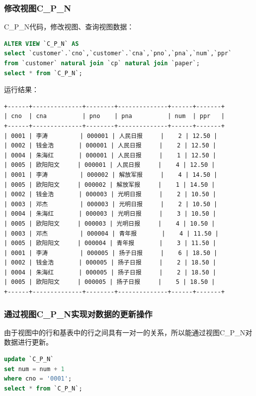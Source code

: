 \documentclass[hyperref,UTF8,c5size]{ctexart}
\begin{document}
        \subsubsection{修改视图C\_P\_N}
            C\_P\_N代码，修改视图、查询视图数据：
		    \begin{lstlisting}[language=SQL]
ALTER VIEW `C_P_N` AS 
select `customer`.`cno`,`customer`.`cna`,`pno`,`pna`,`num`,`ppr`
from `customer` natural join `cp` natural join `paper`;
select * from `C_P_N`;
		    \end{lstlisting}

            运行结果：
            \begin{lstlisting}
+------+--------------+--------+--------------+------+-------+
| cno  | cna          | pno    | pna          | num  | ppr   |
+------+--------------+--------+--------------+------+-------+
| 0001 | 李涛         | 000001 | 人民日报     |    2 | 12.50 |
| 0002 | 钱金浩       | 000001 | 人民日报     |    2 | 12.50 |
| 0004 | 朱海红       | 000001 | 人民日报     |    1 | 12.50 |
| 0005 | 欧阳阳文     | 000001 | 人民日报     |    4 | 12.50 |
| 0001 | 李涛         | 000002 | 解放军报     |    4 | 14.50 |
| 0005 | 欧阳阳文     | 000002 | 解放军报     |    1 | 14.50 |
| 0002 | 钱金浩       | 000003 | 光明日报     |    2 | 10.50 |
| 0003 | 邓杰         | 000003 | 光明日报     |    2 | 10.50 |
| 0004 | 朱海红       | 000003 | 光明日报     |    3 | 10.50 |
| 0005 | 欧阳阳文     | 000003 | 光明日报     |    4 | 10.50 |
| 0003 | 邓杰         | 000004 | 青年报       |    4 | 11.50 |
| 0005 | 欧阳阳文     | 000004 | 青年报       |    3 | 11.50 |
| 0001 | 李涛         | 000005 | 扬子日报     |    6 | 18.50 |
| 0002 | 钱金浩       | 000005 | 扬子日报     |    2 | 18.50 |
| 0004 | 朱海红       | 000005 | 扬子日报     |    2 | 18.50 |
| 0005 | 欧阳阳文     | 000005 | 扬子日报     |    5 | 18.50 |
+------+--------------+--------+--------------+------+-------+
            \end{lstlisting}
        
        \subsubsection{通过视图C\_P\_N实现对数据的更新操作}
            由于视图中的行和基表中的行之间具有一对一的关系，所以能通过视图C\_P\_N对数据进行更新。
		    \begin{lstlisting}[language=SQL]
update `C_P_N`
set num = num + 1
where cno = '0001';
select * from `C_P_N`;
		    \end{lstlisting}
\end{document}
